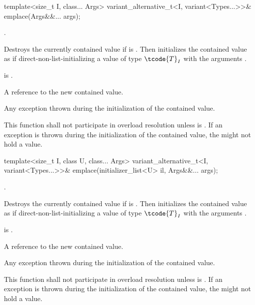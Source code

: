 %
\begin{itemdecl}
template<size_t I, class... Args>
  variant_alternative_t<I, variant<Types...>>& emplace(Args&&... args);
\end{itemdecl}

\begin{itemdescr}
\pnum
\requires
{}.

\pnum
\effects
Destroys the currently contained value if 
is .
Then initializes the contained value as if direct-non-list-initializing
a value of type $\tcode{T}_I$
with the arguments .

\pnum
\ensures
{} is .

\pnum
\returns
A reference to the new contained value.

\pnum
\throws
Any exception thrown during the initialization of the contained value.

\pnum
\remarks
This function shall not participate in overload resolution unless
 is .
If an exception is thrown during the initialization of the contained value,
the  might not hold a value.
\end{itemdescr}

%
\begin{itemdecl}
template<size_t I, class U, class... Args>
  variant_alternative_t<I, variant<Types...>>& emplace(initializer_list<U> il, Args&&... args);
\end{itemdecl}

\begin{itemdescr}
\pnum
\requires
{}.

\pnum
\effects
Destroys the currently contained value if 
is .
Then initializes the contained value as if direct-non-list-initializing
a value of type $\tcode{T}_I$
with the arguments .

\pnum
\ensures
{} is .

\pnum
\returns
A reference to the new contained value.

\pnum
\throws
Any exception thrown during the initialization of the contained value.

\pnum
\remarks
This function shall not participate in overload resolution unless
 is .
If an exception is thrown during the initialization of the contained value,
the  might not hold a value.
\end{itemdescr}

